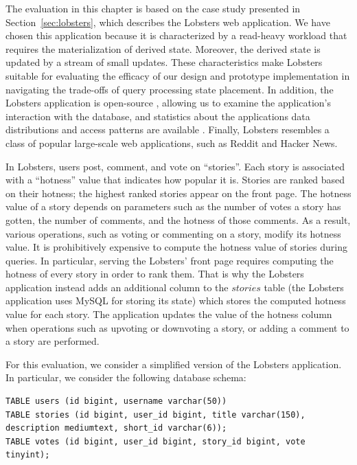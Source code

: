 The evaluation in this chapter is based on the case study presented in Section~\ref{sec:lobsters},
which describes the Lobsters \cite{lobste:rs} web application.
We have chosen this application because it is characterized by a read-heavy workload that requires the materialization
of derived state.
Moreover, the derived state is updated by a stream of small updates.
These characteristics make Lobsters suitable for evaluating the efficacy of our design and prototype implementation in
navigating the trade-offs of query processing state placement.
In addition, the Lobsters application is open-source \cite{lobsters:source},
allowing us to examine the application's interaction with the database,
and statistics about the applications data distributions and access patterns are available \cite{lobste:stats}.
Finally, Lobsters resembles a class of popular large-scale web applications, such as Reddit and Hacker News.

\bigskip
\noindent
In Lobsters, users post, comment, and vote on ``stories''.
Each story is associated with a ``hotness'' value that indicates how popular it is.
Stories are ranked based on their hotness;
the highest ranked stories appear on the front page.
The hotness value of a story depends on parameters such as the number of votes a story has gotten,
the number of comments, and the hotness of those comments.
As a result, various operations, such as voting or commenting on a story, modify its hotness value.
It is prohibitively expensive \cite{gjengset:noria} to compute the hotness value of stories during queries.
In particular, serving the Lobsters' front page requires computing the hotness of every story in order to rank them.
That is why the Lobsters application instead adds an additional column to the $stories$ table (the Lobsters application
uses MySQL for storing its state) which stores the computed hotness value for each story.
The application updates the value of the hotness column when operations such as upvoting or downvoting a story, or
adding a comment to a story are performed.

For this evaluation, we consider a simplified version of the Lobsters application.
In particular, we consider the following database schema:

\begin{lstlisting}[caption={Simplified Lobsters schema used in this evaluation.}]
TABLE users (id bigint, username varchar(50))
TABLE stories (id bigint, user_id bigint, title varchar(150), description mediumtext, short_id varchar(6));
TABLE votes (id bigint, user_id bigint, story_id bigint, vote tinyint);
\end{lstlisting}

